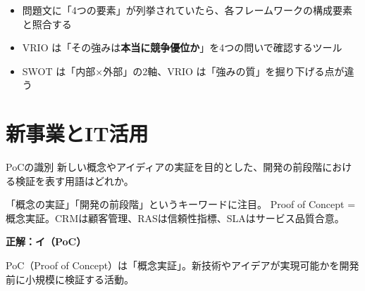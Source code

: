 \begin{minuki}[見抜き方]
\begin{itemize}
  \item 問題文に「4つの要素」が列挙されていたら、各フレームワークの構成要素と照合する
  \item VRIO は「その強みは\textbf{本当に競争優位か}」を4つの問いで確認するツール
  \item SWOT は「内部×外部」の2軸、VRIO は「強みの質」を掘り下げる点が違う
\end{itemize}
\end{minuki}

\section{新事業とIT活用}

\begin{hikaku}[新規事業の関連用語]
\end{hikaku}

\begin{reidai}{PoCの識別}
新しい概念やアイディアの実証を目的とした、開発の前段階における検証を表す用語はどれか。

\end{reidai}

\begin{shishin}
「概念の実証」「開発の前段階」というキーワードに注目。
Proof of Concept = 概念実証。CRMは顧客管理、RASは信頼性指標、SLAはサービス品質合意。
\end{shishin}

\begin{kaitou}
\textbf{正解：イ（PoC）}

PoC（Proof of Concept）は「概念実証」。新技術やアイデアが実現可能かを開発前に小規模に検証する活動。
\end{kaitou}

